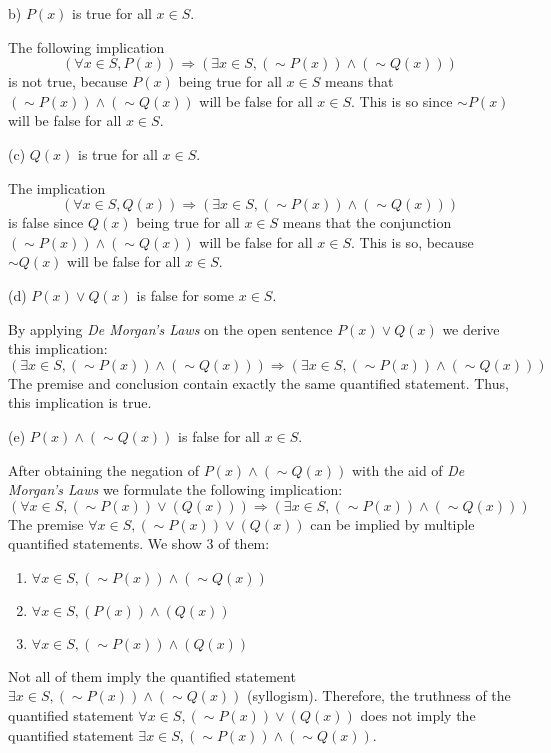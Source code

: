 \documentclass[12pt]{article}
\newenvironment{problem}[2][Problem]{\begin{trivlist}
		\item[\hskip \labelsep {\bfseries #1}\hskip \labelsep {\bfseries #2.}]}{\end{trivlist}}
\newenvironment{solution}[2][Solution]{\begin{trivlist}
		\item[\hskip \labelsep {\bfseries #1}\hskip \labelsep {\bfseries #2.}]}{\end{trivlist}}
\begin{document}
\begin{problem}{72}
(b) $P(x)$ is true for all $x \in S$.
\begin{solution}{b}
	The following implication
	\begin{equation*}
		(\forall x \in S, P(x)) \Rightarrow (\exists x\in S, (\sim P(x))\wedge (\sim Q(x)))
	\end{equation*}
is not true, because $P(x)$ being true for all $x \in S$ means that $(\sim P(x))\wedge (\sim Q(x))$ will be false for all $x \in S$. This is so since $\sim P(x)$ will be false for all $x \in S$.
\end{solution}

(c) $Q(x)$ is true for all $x \in S.$
\begin{solution}{c}
	The implication 
	\begin{equation*}
		(\forall x\in S, Q(x))\Rightarrow (\exists x\in S, (\sim P(x))\wedge (\sim Q(x)))
	\end{equation*}
is false since $Q(x)$ being true for all $x \in S$ means that the conjunction  $(\sim P(x))\wedge (\sim Q(x))$ will be false for all $x \in S$. This is so, because $\sim Q(x)$ will be false for all $x \in S$.
\end{solution}

(d) $P(x)\vee Q(x)$ is false for some $x \in S.$
\begin{solution}{d}
	By applying \textit{De Morgan's Laws} on the open sentence $P(x)\vee Q(x)$ we derive this implication:
	\begin{equation*}
		(\exists x \in S, (\sim P(x)) \wedge (\sim Q(x))) \Rightarrow (\exists x\in S, (\sim P(x))\wedge (\sim Q(x)))
	\end{equation*}
The premise and conclusion contain exactly the same quantified statement. Thus, this implication is true.
\end{solution}

(e) $P(x) \wedge (\sim Q(x))$ is false for all $x \in S$.
\begin{solution}{e}
	After obtaining the negation of $P(x) \wedge (\sim Q(x))$ with the aid of \textit{De Morgan's Laws} we formulate the following implication:
	\begin{equation*}
		(\forall x \in S, (\sim P(x))\vee (Q(x))) \Rightarrow (\exists x\in S, (\sim P(x))\wedge (\sim Q(x)))
	\end{equation*}
The premise $\forall x \in S, (\sim P(x))\vee (Q(x))$ can be implied by multiple quantified statements. We show 3 of them:
\begin{enumerate}
	\item $\forall x \in S, (\sim P(x))\wedge (\sim Q(x))$
	\item $\forall x \in S, (P(x))\wedge (Q(x))$
	\item $\forall x \in S, (\sim P(x)) \wedge (Q(x))$
\end{enumerate}
Not all of them imply the quantified statement $\exists x\in S, (\sim P(x))\wedge (\sim Q(x))$ (syllogism). Therefore, the truthness of the quantified statement $\forall x \in S, (\sim P(x))\vee (Q(x))$ does not imply the quantified statement $\exists x\in S, (\sim P(x))\wedge (\sim Q(x))$. 
\end{solution}
\end{problem}
\end{document}

